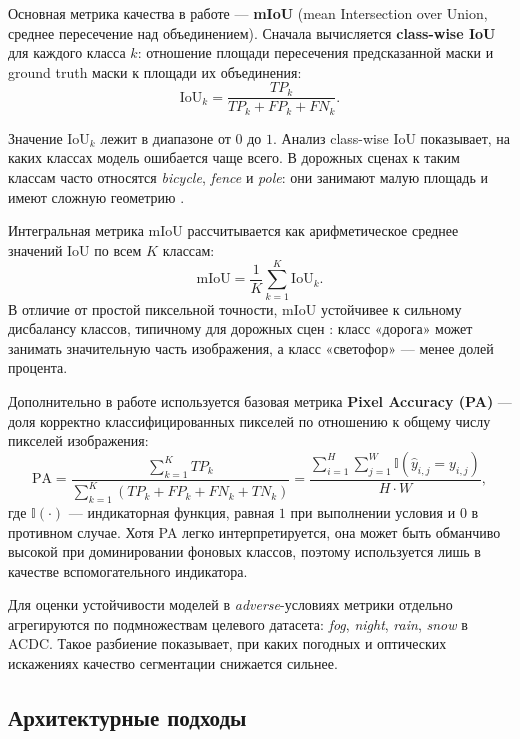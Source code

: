 \documentclass[14pt,a4paper]{extarticle}
\begin{document}
Основная метрика качества в работе --- \textbf{mIoU} (mean Intersection over Union, среднее пересечение над объединением). Сначала вычисляется \textbf{class-wise IoU} для каждого класса $k$: отношение площади пересечения предсказанной маски и ground truth маски к площади их объединения:
\begin{equation}
    \text{IoU}_k = \frac{TP_k}{TP_k + FP_k + FN_k}.
\end{equation}

Значение $\text{IoU}_k$ лежит в диапазоне от $0$ до $1$. Анализ class-wise IoU показывает, на каких классах модель ошибается чаще всего. В дорожных сценах к таким классам часто относятся \textit{bicycle}, \textit{fence} и \textit{pole}: они занимают малую площадь и имеют сложную геометрию \cite{cordts2016cityscapes}.

Интегральная метрика mIoU рассчитывается как арифметическое среднее значений IoU по всем $K$ классам:
\begin{equation}
    \text{mIoU} = \frac{1}{K} \sum_{k=1}^{K} \text{IoU}_k.
\end{equation}
В отличие от простой пиксельной точности, mIoU устойчивее к сильному дисбалансу классов, типичному для дорожных сцен \cite{cordts2016cityscapes}: класс «дорога» может занимать значительную часть изображения, а класс «светофор» --- менее долей процента.

Дополнительно в работе используется базовая метрика \textbf{Pixel Accuracy (PA)} --- доля корректно классифицированных пикселей по отношению к общему числу пикселей изображения:
\begin{equation}
    \text{PA} = \frac{\sum_{k=1}^{K} TP_k}{\sum_{k=1}^{K} (TP_k + FP_k + FN_k + TN_k)} = \frac{\sum_{i=1}^{H} \sum_{j=1}^{W} \mathbb{I}(\hat{y}_{i,j} = y_{i,j})}{H \cdot W},
\end{equation}
где $\mathbb{I}(\cdot)$ --- индикаторная функция, равная $1$ при выполнении условия и $0$ в противном случае. Хотя PA легко интерпретируется, она может быть обманчиво высокой при доминировании фоновых классов, поэтому используется лишь в качестве вспомогательного индикатора.

Для оценки устойчивости моделей в \textit{adverse}-условиях метрики отдельно агрегируются по подмножествам целевого датасета: \textit{fog}, \textit{night}, \textit{rain}, \textit{snow} в ACDC. Такое разбиение показывает, при каких погодных и оптических искажениях качество сегментации снижается сильнее.

\subsection{Архитектурные подходы}
\end{document}
